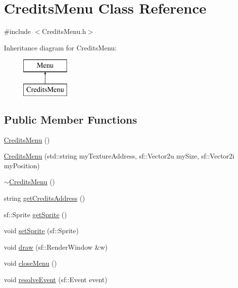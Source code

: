 \hypertarget{class_credits_menu}{\section{Credits\+Menu Class Reference}
\label{class_credits_menu}
}


{\ttfamily \#include $<$Credits\+Menu.\+h$>$}

Inheritance diagram for Credits\+Menu\+:\begin{figure}[H]
\begin{center}
\leavevmode
\includegraphics[height=2.000000cm]{class_credits_menu}
\end{center}
\end{figure}
\subsection*{Public Member Functions}
\begin{DoxyCompactItemize}
\item 
\hyperlink{class_credits_menu_a5faefd77a6bf66b98de838e28f1beff1}{Credits\+Menu} ()
\item 
\hyperlink{class_credits_menu_ab044c04c75903dfd5ddc1d1c9e22dc97}{Credits\+Menu} (std\+::string my\+Texture\+Address, sf\+::\+Vector2u my\+Size, sf\+::\+Vector2i my\+Position)
\item 
\hyperlink{class_credits_menu_afab6fd75a71b5faa26508907c28ef3b4}{$\sim$\+Credits\+Menu} ()
\item 
string \hyperlink{class_credits_menu_a7ce3ffb34ef6b1d74a6975506c3f8a92}{get\+Credits\+Address} ()
\item 
sf\+::\+Sprite \hyperlink{class_credits_menu_a285f9f79c86cc255743f70ba7f23e22b}{get\+Sprite} ()
\item 
void \hyperlink{class_credits_menu_ad0d86e63b66e1a68bd6600e59040ff18}{set\+Sprite} (sf\+::\+Sprite)
\item 
void \hyperlink{class_credits_menu_a64fe7f7471ab92c69cbc95cb4ad9dfc8}{draw} (sf\+::\+Render\+Window \&w)
\item 
void \hyperlink{class_credits_menu_afe78658efba17b95a8a7d87d4a90c4d3}{close\+Menu} ()
\item 
void \hyperlink{class_credits_menu_a6fa8421ffafa70e6d6e3af1f61b220c7}{resolve\+Event} (sf\+::\+Event event)
\end{DoxyCompactItemize}
